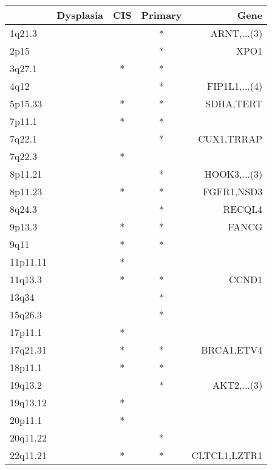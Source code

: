 \begin{tabular}{lcccr}
\toprule
{} & Dysplasia & CIS & Primary &           Gene \\
\midrule
1q21.3   &           &     &       * &    ARNT,...(3) \\
2p15     &           &     &       * &           XPO1 \\
3q27.1   &           &   * &       * &                \\
4q12     &           &     &       * &  FIP1L1,...(4) \\
5p15.33  &           &   * &       * &      SDHA,TERT \\
7p11.1   &           &   * &       * &                \\
7q22.1   &           &     &       * &     CUX1,TRRAP \\
7q22.3   &           &   * &         &                \\
8p11.21  &           &     &       * &   HOOK3,...(3) \\
8p11.23  &           &   * &       * &     FGFR1,NSD3 \\
8q24.3   &           &     &       * &         RECQL4 \\
9p13.3   &           &   * &       * &          FANCG \\
9q11     &           &   * &       * &                \\
11p11.11 &           &   * &         &                \\
11q13.3  &           &   * &       * &          CCND1 \\
13q34    &           &     &       * &                \\
15q26.3  &           &     &       * &                \\
17p11.1  &           &   * &         &                \\
17q21.31 &           &   * &       * &     BRCA1,ETV4 \\
18p11.1  &           &   * &       * &                \\
19q13.2  &           &     &       * &    AKT2,...(3) \\
19q13.12 &           &   * &         &                \\
20p11.1  &           &   * &         &                \\
20q11.22 &           &     &       * &                \\
22q11.21 &           &   * &       * &   CLTCL1,LZTR1 \\
\bottomrule
\end{tabular}
